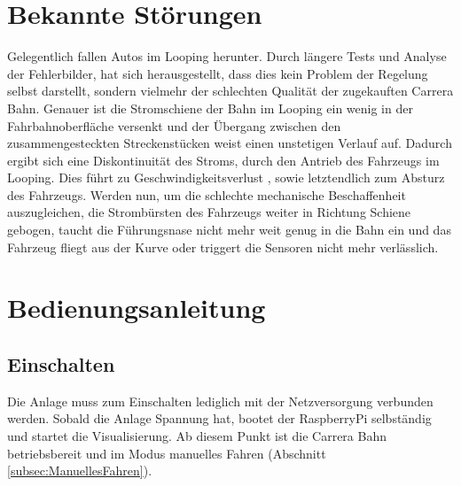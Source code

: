\documentclass[a4paper, 11pt]{report}
\begin{document}
\chapter{Bekannte Störungen}\label {cha:err}
Gelegentlich fallen Autos im Looping herunter.
Durch längere Tests und Analyse der Fehlerbilder, hat sich herausgestellt, dass dies kein Problem der Regelung selbst darstellt, sondern vielmehr der schlechten Qualität der zugekauften Carrera Bahn.
Genauer ist die Stromschiene der Bahn im Looping ein wenig in der Fahrbahnoberfläche versenkt und der Übergang zwischen den zusammengesteckten Streckenstücken weist einen unstetigen Verlauf auf. Dadurch ergibt sich eine Diskontinuität des Stroms, durch den Antrieb des Fahrzeugs im Looping. Dies führt zu Geschwindigkeitsverlust , sowie letztendlich zum Absturz des Fahrzeugs. Werden nun, um die schlechte mechanische Beschaffenheit auszugleichen,  die Strombürsten des Fahrzeugs weiter in Richtung Schiene gebogen, taucht die Führungsnase nicht mehr weit genug in die Bahn ein und das Fahrzeug fliegt aus der Kurve oder triggert die Sensoren nicht mehr verlässlich.

\chapter{Bedienungsanleitung}
\section{Einschalten}
	Die Anlage muss zum Einschalten lediglich mit der Netzversorgung verbunden werden. Sobald die Anlage Spannung hat, bootet der RaspberryPi selbständig und startet die Visualisierung. Ab diesem Punkt ist die Carrera Bahn betriebsbereit und im Modus manuelles Fahren (Abschnitt \ref{subsec:ManuellesFahren}).
\end{document}
